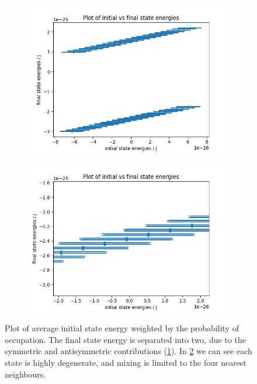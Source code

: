 \begin{figure}[htbp]
    \centering
    \begin{subfigure}{0.45\linewidth}
        \includegraphics[width=0.9\linewidth]{Figures/Simulation/Plot of single band eigenstate energy range.png}
        \label{fig:initial and final state energies of single band}
    \end{subfigure}
    \begin{subfigure}{0.45\linewidth}
        \includegraphics[width=0.9\linewidth]{Figures/Simulation/Plot of single band eigenstate energy range closeup.png}
        \label{fig:initial and final state energies of single band zoom}
    \end{subfigure}
    \caption{Plot of average initial state energy weighted by the
        probability of occupation. The final
        state energy is separated into two,
        due to the symmetric and antisymmetric
        contributions
        (\cref{fig:initial and final state energies of single band}).
        In \cref{fig:initial and final state energies of single band zoom}
        we can see each state is highly degenerate, and mixing
        is limited to the four nearest neighbours.
    }\label{fig:single band energies}
\end{figure}


